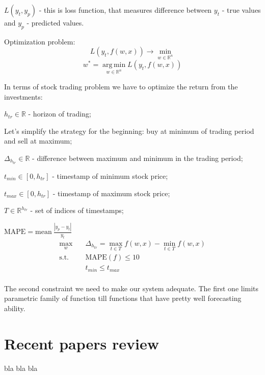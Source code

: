 \documentclass{article}
\DeclareMathOperator*{\argmin}{arg\,min}
\begin{document}
    $L(y_{t}, y_{p})$ - this is loss function, that measures difference between $y_t$ - true values and $y_p$ - predicted values.
    
    Optimization problem:
    \begin{equation}
        L(y_t, f(w, x)) \rightarrow \min\limits_{w\in\mathbb{R}^n}
    \end{equation}
    \begin{equation}
        w^* = \argmin\limits_{w\in\mathbb{R}^n} L(y_t, f(w, x)) 
    \end{equation}
    
    In terms of stock trading problem we have to optimize the return from the investments:
    
    $h_{tr} \in \mathbb{R}$ - horizon of trading;
    
    Let's simplify the strategy for the beginning: buy at minimum of trading period and sell at maximum;
    
    $\Delta_{h_{tr}} \in \mathbb{R}$ - difference between maximum and minimum in the trading period;
    
    $t_{min} \in [0, h_{tr}]$ - timestamp of minimum stock price;
    
    $t_{max} \in [0, h_{tr}]$ - timestamp of maximum stock price;
    
    $T \in \mathbb{R}^{h_{tr}}$ - set of indices of timestamps;
    
    $\text{MAPE} = \text{mean}~\frac{|y_p - y_t|}{y_t}$
    \begin{equation}
        \begin{aligned}
            \max_{w} \quad & \Delta_{h_{tr}} = \max_{t \in T}f(w,x) - \min_{t \in T}f(w,x)\\
            \textrm{s.t.} \quad & \text{MAPE}(f) \leq 10 \\
            & t_{min} \leq t_{max}    \\
        \end{aligned}
    \end{equation}
    
    The second constraint we need to make our system adequate. The first one limits parametric family of function till functions that have pretty well forecasting ability.

\section{Recent papers review}
    bla bla bla
    
\end{document}
